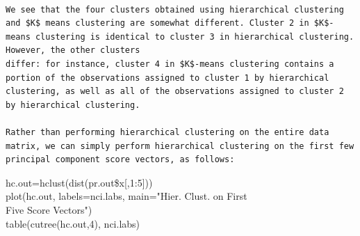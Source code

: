 \documentclass[10pt]{article}
\begin{document}
\begin{verbatim}

We see that the four clusters obtained using hierarchical clustering and $K$ means clustering are somewhat different. Cluster 2 in $K$-means clustering is identical to cluster 3 in hierarchical clustering. However, the other clusters
differ: for instance, cluster 4 in $K$-means clustering contains a portion of the observations assigned to cluster 1 by hierarchical clustering, as well as all of the observations assigned to cluster 2 by hierarchical clustering.

Rather than performing hierarchical clustering on the entire data matrix, we can simply perform hierarchical clustering on the first few principal component score vectors, as follows:
\end{verbatim}

\begin{displayquote}
hc.out=hclust(dist(pr.out\$x[,1:5]))\\
plot(hc.out, labels=nci.labs, main="Hier. Clust. on First\\
Five Score Vectors")\\
table(cutree(hc.out,4), nci.labs)
\end{displayquote}
\end{document}

